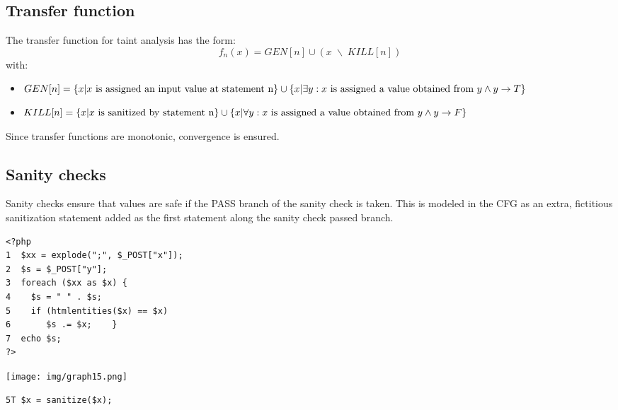 \documentclass[a4paper, 10pt, titlepage]{article}
\begin{document}
\subsection{Transfer function}
The transfer function for taint analysis has the form: 
$$f_n(x) = GEN[n] \cup (x \; \backslash \; KILL[n])$$
with:
\begin{itemize}
\item $GEN[n] = \{x | x \text{ is assigned an input value at statement n} \} \cup \\\{x | \exists y: x \text{ is assigned a value obtained from } y \wedge y \rightarrow T\}$
\item $KILL[n] = \{x | x \text{ is sanitized by statement n} \} \cup \\\{x | \forall y: x \text{ is assigned a value obtained from } y \wedge y \rightarrow F\}$
\end{itemize} 
Since transfer functions are monotonic, convergence is ensured.

\subsection{Sanity checks}
Sanity checks ensure that values are safe if the PASS branch of the sanity check is taken. This is modeled in the CFG as an extra, fictitious sanitization statement added as the first statement along the sanity check passed branch. \\
\begin{minipage}{0.5\textwidth}
\begin{small}
\begin{lstlisting}
<?php 
1  $xx = explode(";", $_POST["x"]); 
2  $s = $_POST["y"]; 
3  foreach ($xx as $x) { 
4    $s = " " . $s; 
5    if (htmlentities($x) == $x) 
6       $s .= $x;    } 
7  echo $s; 
?>
\end{lstlisting}
\end{small}
\end{minipage}
\hfill\vline\hfill
\begin{minipage}{0.4\textwidth}
\begin{center}
\texttt{[image: img/graph15.png]}
\end{center}
\begin{lstlisting}
5T $x = sanitize($x);
\end{lstlisting}
\end{minipage}
\end{document}

